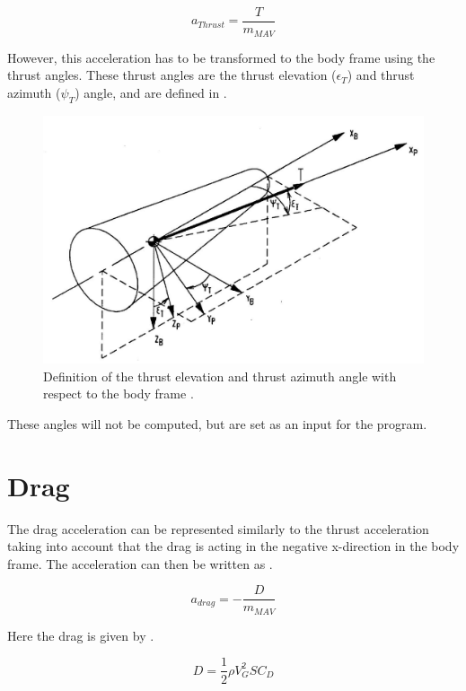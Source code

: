 \begin{equation} \label{eq:thrustModel}
a_{Thrust}=\dfrac{T}{m_{MAV}}
\end{equation}

However, this acceleration has to be transformed to the body frame using the thrust angles. These thrust angles are the thrust elevation ($\epsilon_{T}$) and thrust azimuth ($\psi_{T}$) angle, and are defined in .

\begin{figure}[!ht]
\centering
\includegraphics[width=0.8 \textwidth]{figures/reference_frames/propframe_mooij1994motion.jpg}
\caption{Definition of the thrust elevation and thrust azimuth angle with respect to the body frame \citep{mooij1994motion}.}
\label{fig:propframe_mooij1994motion}
\end{figure}

These angles will not be computed, but are set as an input for the program.


\section{Drag}
\label{sec:dragModel}
The drag acceleration can be represented similarly to the thrust acceleration taking into account that the drag is acting in the negative x-direction in the body frame. The acceleration can then be written as .

\begin{equation} \label{eq:dragModel}
a_{drag}=-\dfrac{D}{m_{MAV}}
\end{equation}



Here the drag is given by .

\begin{equation} \label{eq:dragDragModel}
D=\dfrac{1}{2}\rho V_{G}^{2}SC_{D}
\end{equation}

